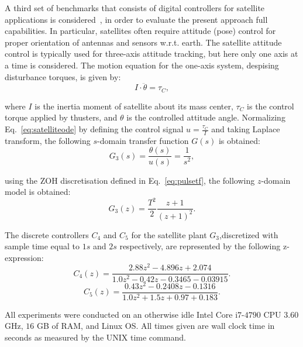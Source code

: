 \documentclass{sig-alternate-05-2015}
\begin{document}
A third set of benchmarks that consists of digital controllers for satellite
applications is considered~\cite{Franklin15}, in order to evaluate the
present approach full capabilities.  In particular, satellites often require
attitude (pose) control for proper orientation of antennas and sensors
w.r.t.  earth.  The satellite attitude control is typically used for
three-axis attitude tracking, but here only one axis at a time is
considered.  The motion equation for the one-axis system, despising
disturbance torques, is given by:
%
\begin{equation}
\label{eq:satelliteode}
I\cdot \ddot{\theta} = \tau_{C},
\end{equation}

\noindent where $I$ is the inertia moment of satellite about its mass center, $\tau_{C}$ is the control 
torque applied by thusters, and $\theta$ is the controlled attitude angle. 
Normalizing Eq.~\eqref{eq:satelliteode} by defining the control signal $u=\frac{\tau_{C}}{I}$ and 
taking Laplace transform, the following $s$-domain transfer function $G(s)$ is obtained:
%
\begin{equation}
\label{eq:satellitetf}
G_{3}(s)=\frac{\theta(s)}{u(s)}=\frac{1}{s^2},
\end{equation}

\noindent using the ZOH discretisation defined in Eq.~\eqref{eq:pulsetf}, 
the following $z$-domain model is obtained:
\begin{equation}
G_{3}(z)= \frac{T^{2}}{2} \frac{z+1}{(z+1)^{2}}.
\end{equation}

The discrete controllers $C_{4}$ and $C_{5}$ for the satellite plant $G_{3}$,discretized with sample time equal to $1 s$ and $2 s$ respectively, 
are represented by the following z-expression:
%
\begin{equation}
\label{satellite-b2}
C_{4}(z)=\frac{2.88z^2 - 4.896z + 2.074}{1.0z^2 - 0.42z - 0.3465 - 0.03915}. \nonumber
\end{equation} 
%
\begin{equation}
\label{satellite-c2}
C_{5}(z)=\frac{0.43z^2 - 0.2408z - 0.1316}{1.0z^2 + 1.5z + 0.97 + 0.183}. \nonumber
\end{equation} 

All experiments were conducted on an otherwise idle Intel Core i$7$-$4790$ 
CPU $3$.$60$ GHz, $16$ GB of RAM, and Linux OS.  All times given are wall 
clock time in seconds as measured by the UNIX time command.

\end{document}
